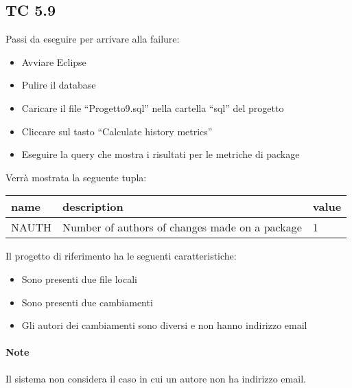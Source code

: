 \subsection*{TC 5.9}
Passi da eseguire per arrivare alla failure:
\begin{itemize}
 \item Avviare Eclipse
 \item Pulire il database
 \item Caricare il file ``Progetto9.sql'' nella cartella ``sql'' del progetto
 \item Cliccare sul tasto ``Calculate history metrics''
 \item Eseguire la query che mostra i risultati per le metriche di package
\end{itemize}
Verrà mostrata la seguente tupla:
\begin{table}[ht]
 \centering
 \footnotesize
 \begin{tabular}{|l|p{8cm}|l|}
  \hline
  \textbf{name}		& \textbf{description}		& \textbf{value}		\\
  \hline
  NAUTH		& Number of authors of changes made on a package	& 	1 \\
  \hline
 \end{tabular} 
\end{table}
\vspace{0.5cm}
\newline
Il progetto di riferimento ha le seguenti caratteristiche:
\begin{itemize}
 \item Sono presenti due file locali
 \item Sono presenti due cambiamenti
 \item Gli autori dei cambiamenti sono diversi e non hanno indirizzo email
\end{itemize}

\paragraph{Note} Il sistema non considera il caso in cui un autore non ha indirizzo email.


